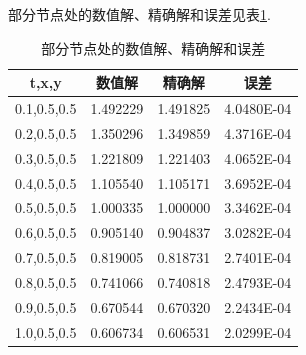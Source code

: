\documentclass[withoutpreface,bwprint]{cumcmthesis} %
\begin{document}
部分节点处的数值解、精确解和误差见表\ref{tab:1}.
\begin{table}[htbp]
	\centering
	\caption{部分节点处的数值解、精确解和误差}
	\begin{tabular}{cccc}
		\toprule[1.5pt]
		t,x,y & 数值解   & 精确解   & 误差 \\
		\midrule[1pt]
		0.1,0.5,0.5 & 1.492229  & 1.491825  & 4.0480E-04 \\
		0.2,0.5,0.5 & 1.350296  & 1.349859  & 4.3716E-04 \\
		0.3,0.5,0.5 & 1.221809  & 1.221403  & 4.0652E-04 \\
		0.4,0.5,0.5 & 1.105540  & 1.105171  & 3.6952E-04 \\
		0.5,0.5,0.5 & 1.000335  & 1.000000  & 3.3462E-04 \\
		0.6,0.5,0.5 & 0.905140  & 0.904837  & 3.0282E-04 \\
		0.7,0.5,0.5 & 0.819005  & 0.818731  & 2.7401E-04 \\
		0.8,0.5,0.5 & 0.741066  & 0.740818  & 2.4793E-04 \\
		0.9,0.5,0.5 & 0.670544  & 0.670320  & 2.2434E-04 \\
		1.0,0.5,0.5 & 0.606734  & 0.606531  & 2.0299E-04 \\
		\bottomrule[1.5pt]
	\end{tabular}%
	\label{tab:1}%
\end{table}%
\end{document}
